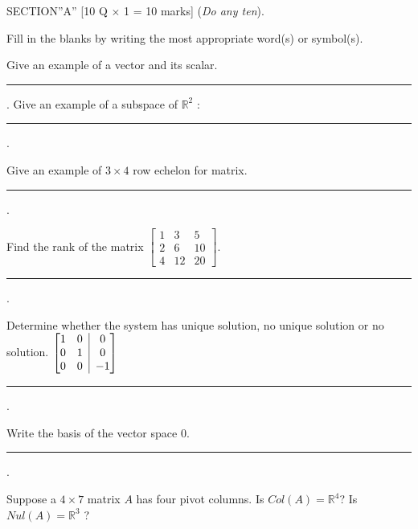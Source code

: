 \documentclass[12pt]{exam}
\begin{document}
\begin{center}
  SECTION''A'' \hspace{5mm} [10 Q \(\times\) 1 = 10 marks] (\textit{Do any ten}).
\end{center}
Fill in the blanks by writing the most appropriate word(s) or symbol(s).
\begin{questions}
\question Give an example of a vector and its scalar. \rule{7cm}{0.15mm}.
\question Give an example of a subspace of $\mathbb{R}^2$ : \rule{8cm}{0.15mm}.

\question Give an example of $3 \times 4 $ row echelon for matrix. \rule{7cm}{0.15mm}.

\question Find the rank of the matrix $\displaystyle \begin{bmatrix}
    1 & 3 & 5 \\
    2 & 6 & 10 \\
    4  & 12 & 20
\end{bmatrix}.$ \rule{7cm}{0.15mm}.

\question Determine whether the system has unique solution, no unique solution or no solution. $ \left[ \begin{matrix}
    1 & 0  \\
    0 & 1  \\
    0 & 0
\end{matrix} \;\; \vline \;\;
\begin{matrix}
    0\\ 0\\ -1
\end{matrix} \right]$ \rule{7cm}{0.15mm}.

\question Write the basis of the vector space ${0}$. \rule{7cm}{0.15mm}.

 \question Suppose a $4 \times 7$ matrix $A$ has four pivot columns. Is $Col(A) = \mathbb{R}^4$? Is $Nul(A) = \mathbb{R}^3$ ?
\end{questions}
\end{document}
